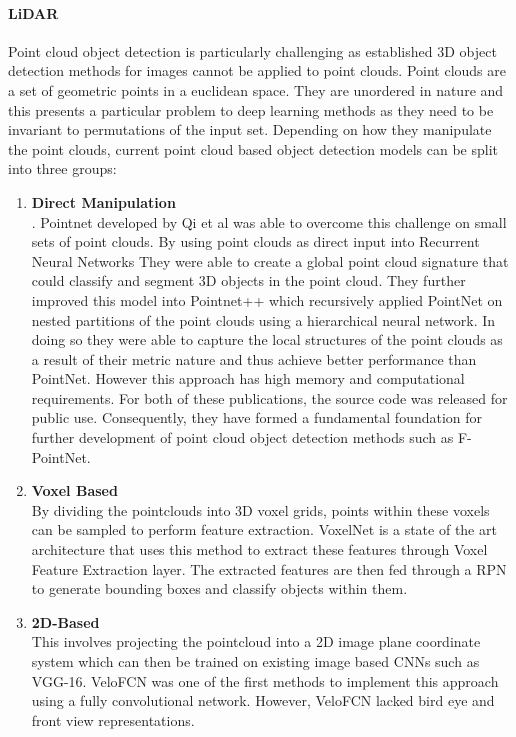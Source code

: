 \paragraph{LiDAR} 
Point cloud object detection is particularly challenging as established 3D object detection methods for images cannot be applied to point clouds. Point clouds are a set of geometric points in a euclidean space. They are unordered in nature and this presents a particular problem to deep learning methods as they need to be invariant to permutations of the input set.
Depending on how they manipulate the point clouds, current point cloud based object detection models can be split into three groups:
\begin{enumerate}
	\item \textbf{Direct Manipulation} \\ . 
	Pointnet\cite{qi2017pointnet} developed by Qi et al was able to overcome this challenge on small sets of point clouds. By using point clouds as direct input into Recurrent Neural Networks\cite{medsker2001recurrent} They were able to create a global point cloud signature that could classify and segment 3D objects in the point cloud. They further improved this model into Pointnet++\cite{qi2017pointnet++} which recursively applied PointNet on nested partitions of the point clouds using a hierarchical neural network. In doing so they were able to capture the local structures of the point clouds as a result of their metric nature and thus achieve better performance than PointNet. However this approach has high memory and computational requirements. For both of these publications, the source code was released for public use. Consequently, they have formed a fundamental foundation for further development of point cloud object detection methods such as F-PointNet\cite{qi2017frustum}.
	
	\item \textbf{Voxel Based} \\
	By dividing the pointclouds into 3D voxel grids, points within these voxels can be sampled to perform feature extraction. VoxelNet \cite{zhou2017voxelnet} is a state of the art architecture that uses this method to extract these features through Voxel Feature Extraction layer. The extracted features are then fed through a RPN to generate bounding boxes and classify objects within them. 
	
	\item \textbf{2D-Based }\\
	This involves projecting the pointcloud into a 2D image plane coordinate system which can then be trained on existing image based CNNs  such as VGG-16. VeloFCN \cite{li2016vehicle} was one of the first methods to implement this approach using a fully convolutional network. However, VeloFCN lacked bird eye and front view representations. 
	
\end{enumerate}



